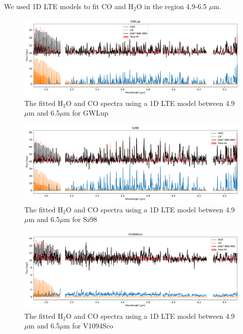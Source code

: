 \documentclass[twoside, single, authoryear, semicolon]{lion-msc}
\newcommand{\4}{$_4$}
\newcommand{\3}{$_3$}
\newcommand{\2}{$_2$}
\begin{document}
We used 1D LTE models to fit CO and H\2O in the region 4.9-6.5 $\mu$m.

\begin{figure}[!ht]
    \centering
    \includegraphics[width=\linewidth]{Figures/Fit_GWLup.pdf}
    \caption{The fitted H\2O and CO spectra using a 1D LTE model between 4.9 $\mu$m and 6.5$\mu$m for GWLup}
    \label{fig: fit gwlup}
\end{figure}
\begin{figure}[!ht]
    \centering
    \includegraphics[width=\linewidth]{Figures/Fit_Sz98.pdf}
    \caption{The fitted H\2O and CO spectra using a 1D LTE model between 4.9 $\mu$m and 6.5$\mu$m for Sz98}
    \label{fig: fit sz98}
\end{figure}
\begin{figure}[!ht]
    \centering
    \includegraphics[width=\linewidth]{Figures/Fit_V1094Sco.pdf}
    \caption{The fitted H\2O and CO spectra using a 1D LTE model between 4.9 $\mu$m and 6.5$\mu$m for V1094Sco}
    \label{fig: v1094sco}
\end{figure}
\end{document}
